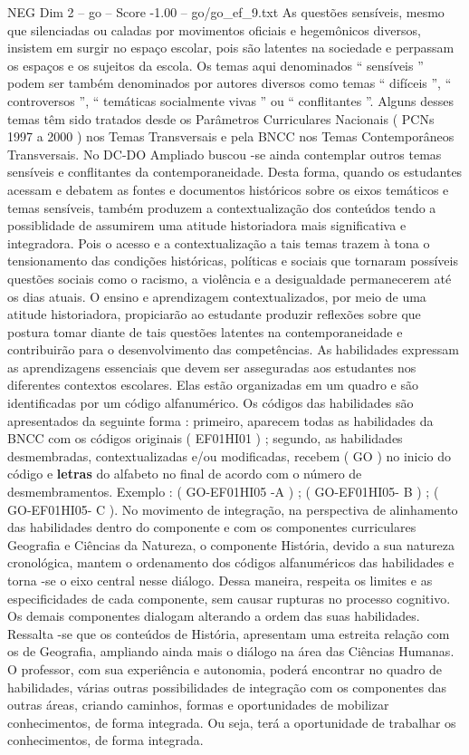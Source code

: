 \begin{textsample}{NEG Dim 2 – go – Score -1.00 – go/go\_ef\_9.txt}
As questões sensíveis, mesmo que silenciadas ou caladas por movimentos oficiais e hegemônicos diversos, insistem em surgir no espaço escolar, pois são latentes na sociedade e perpassam os espaços e os sujeitos da escola.
Os temas aqui denominados “ sensíveis ” podem ser também denominados por autores diversos como temas “ difíceis ”, “ controversos ”, “ temáticas socialmente vivas ” ou “ conflitantes ”.
Alguns desses temas têm sido tratados desde os Parâmetros Curriculares Nacionais ( PCNs 1997 a 2000 ) nos Temas Transversais e pela BNCC nos Temas Contemporâneos Transversais.
No DC-DO Ampliado buscou -se ainda contemplar outros temas sensíveis e conflitantes da contemporaneidade.
Desta forma, quando os estudantes acessam e debatem as fontes e documentos históricos sobre os eixos temáticos e temas sensíveis, também produzem a contextualização dos conteúdos tendo a possiblidade de assumirem uma atitude historiadora mais significativa e integradora.
Pois o acesso e a contextualização a tais temas trazem à tona o tensionamento das condições históricas, políticas e sociais que tornaram possíveis questões sociais como o racismo, a violência e a desigualdade permanecerem até os dias atuais.
O ensino e aprendizagem contextualizados, por meio de uma atitude historiadora, propiciarão ao estudante produzir reflexões sobre que postura tomar diante de tais questões latentes na contemporaneidade e contribuirão para o desenvolvimento das competências.
As habilidades expressam as aprendizagens essenciais que devem ser asseguradas aos estudantes nos diferentes contextos escolares.
Elas estão organizadas em um quadro e são identificadas por um código alfanumérico.
Os códigos das habilidades são apresentados da seguinte forma : primeiro, aparecem todas as habilidades da BNCC com os códigos originais ( EF01HI01 ) ; segundo, as habilidades desmembradas, contextualizadas e/ou modificadas, recebem ( GO ) no inicio do código e \textbf{letras} do alfabeto no final de acordo com o número de desmembramentos.
Exemplo : ( GO-EF01HI05 -A ) ; ( GO-EF01HI05- B ) ; ( GO-EF01HI05- C ).
No movimento de integração, na perspectiva de alinhamento das habilidades dentro do componente e com os componentes curriculares Geografia e Ciências da Natureza, o componente História, devido a sua natureza cronológica, mantem o ordenamento dos códigos alfanuméricos das habilidades e torna -se o eixo central nesse diálogo.
Dessa maneira, respeita os limites e as especificidades de cada componente, sem causar rupturas no processo cognitivo.
Os demais componentes dialogam alterando a ordem das suas habilidades.
Ressalta -se que os conteúdos de História, apresentam uma estreita relação com os de Geografia, ampliando ainda mais o diálogo na área das Ciências Humanas.
O professor, com sua experiência e autonomia, poderá encontrar no quadro de habilidades, várias outras possibilidades de integração com os componentes das outras áreas, criando caminhos, formas e oportunidades de mobilizar conhecimentos, de forma integrada.
Ou seja, terá a oportunidade de trabalhar os conhecimentos, de forma integrada.

\end{textsample}
